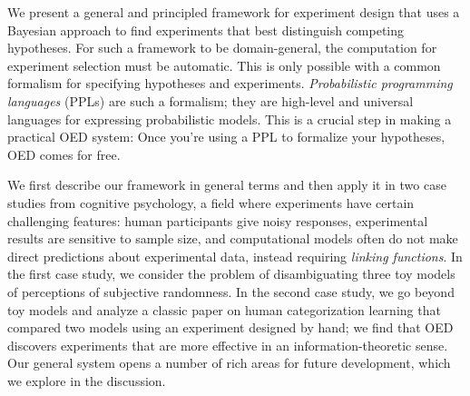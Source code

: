 \documentclass{article}
\newcommand{\ndg}[1]{\textcolor{Green}{[ndg: #1]}}
\begin{document}
We present a general and principled framework for experiment design that uses a Bayesian approach to find experiments that best distinguish competing hypotheses.
For such a framework to be domain-general, the computation for experiment selection must be automatic.
This is only possible with a common formalism for specifying hypotheses and experiments.
\emph{Probabilistic programming languages} (PPLs) are such a formalism; they are high-level and universal languages for expressing probabilistic models.
This is a crucial step in making a practical OED system: Once you're using a PPL to formalize your hypotheses, OED comes for free.

We first describe our framework in general terms and then apply it in two case studies from cognitive psychology, a field where experiments have certain challenging features: human participants give noisy responses, experimental results are sensitive to sample size, and computational models often do not make direct predictions about experimental data, instead requiring \emph{linking functions}.
In the first case study, we consider the problem of disambiguating three toy models of perceptions of subjective randomness.
In the second case study, we go beyond toy models and analyze a classic paper on human categorization learning that compared two models using an experiment designed by hand; we find that OED discovers experiments that are more effective in an information-theoretic sense.
Our general system opens a number of rich areas for future development, which we explore in the discussion.

\end{document}
